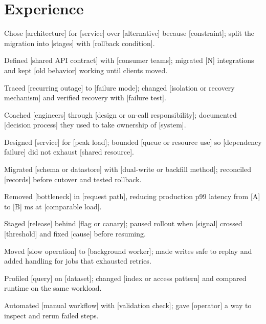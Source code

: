 \documentclass{resume}
\begin{document}

\section{Experience}

\begin{jobduties}
  \item Chose [architecture] for [service] over [alternative] because [constraint]; split the migration into [stages] with [rollback condition].
  \item Defined [shared API contract] with [consumer teams]; migrated [N] integrations and kept [old behavior] working until clients moved.
  \item Traced [recurring outage] to [failure mode]; changed [isolation or recovery mechanism] and verified recovery with [failure test].
  \item Coached [engineers] through [design or on-call responsibility]; documented [decision process] they used to take ownership of [system].
\end{jobduties}

\begin{jobduties}
  \item Designed [service] for [peak load]; bounded [queue or resource use] so [dependency failure] did not exhaust [shared resource].
  \item Migrated [schema or datastore] with [dual-write or backfill method]; reconciled [records] before cutover and tested rollback.
  \item Removed [bottleneck] in [request path], reducing production p99 latency from [A] to [B] ms at [comparable load].
  \item Staged [release] behind [flag or canary]; paused rollout when [signal] crossed [threshold] and fixed [cause] before resuming.
\end{jobduties}

\begin{jobduties}
  \item Moved [slow operation] to [background worker]; made writes safe to replay and added handling for jobs that exhausted retries.
  \item Profiled [query] on [dataset]; changed [index or access pattern] and compared runtime on the same workload.
  \item Automated [manual workflow] with [validation check]; gave [operator] a way to inspect and rerun failed steps.
\end{jobduties}
\end{document}
